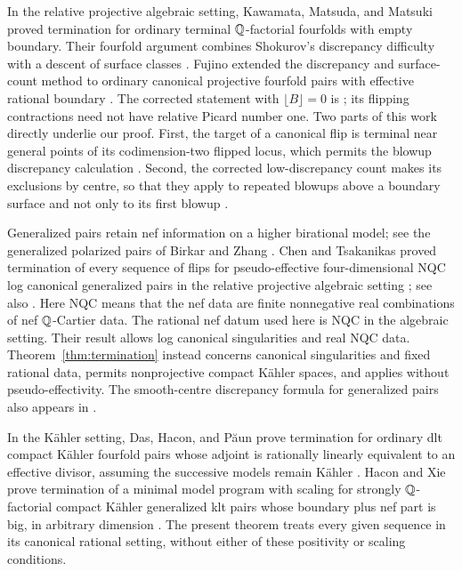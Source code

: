 In the relative projective algebraic setting, Kawamata, Matsuda,
and Matsuki proved termination for ordinary terminal
$\mathbb Q$-factorial fourfolds with empty boundary. Their fourfold argument
combines Shokurov's discrepancy difficulty with a descent of surface
classes \cite[Theorem~5-1-15 and its proof]{KMM1987}.
Fujino extended the discrepancy and surface-count method to ordinary
canonical projective fourfold pairs with effective rational boundary
\cite{Fujino2004}. The corrected statement with
$\lfloor B\rfloor=0$ is \cite[Theorem~5.1]{Fujino2005Addendum}; its
flipping contractions need not have relative Picard number one.
Two parts of this work directly underlie our proof. First, the target
of a canonical flip is terminal near general points of its
codimension-two flipped locus, which permits the blowup discrepancy
calculation \cite[Lemma~2.2]{Fujino2004}. Second, the corrected
low-discrepancy count makes its exclusions by centre, so that they
apply to repeated blowups above a boundary surface and not only to
its first blowup
\cite[Proposition~3.1 and Lemma~3.2]{Fujino2005Addendum}.

Generalized pairs retain nef information on a higher birational
model; see the generalized polarized pairs of
Birkar and Zhang \cite[Definition~1.4 and Section~4]{BirkarZhang2016}.
Chen and Tsakanikas proved termination of every sequence of flips for
pseudo-effective four-dimensional NQC log canonical generalized pairs
in the relative projective algebraic setting
\cite[Theorem~1.1]{ChenTsakanikas2023}; see also
\cite[Theorem~4.4]{Moraga2025}.
Here NQC means that the nef data are finite nonnegative real
combinations of nef $\mathbb Q$-Cartier data.
The rational nef datum used here is NQC in the algebraic setting.
Their result allows log canonical singularities and real NQC data.
Theorem~\ref{thm:termination} instead concerns canonical singularities
and fixed rational data, permits nonprojective compact K\"ahler spaces,
and applies without pseudo-effectivity. The smooth-centre discrepancy
formula for generalized pairs also appears in
\cite[Lemma~2.9]{ChenTsakanikas2023}.

In the K\"ahler setting, Das, Hacon, and P\u{a}un prove termination
for ordinary dlt compact K\"ahler fourfold pairs whose adjoint is rationally linearly
equivalent to an effective divisor, assuming the successive models
remain K\"ahler \cite[Theorem~6.6]{DHP2024}.
Hacon and Xie prove termination of a minimal model program with
scaling for strongly $\mathbb Q$-factorial compact K\"ahler generalized klt
pairs whose boundary plus nef part is big, in arbitrary dimension
\cite[Theorem~1.5]{HX2026}. The present theorem treats every given
sequence in its canonical rational setting, without either of these
positivity or scaling conditions.


